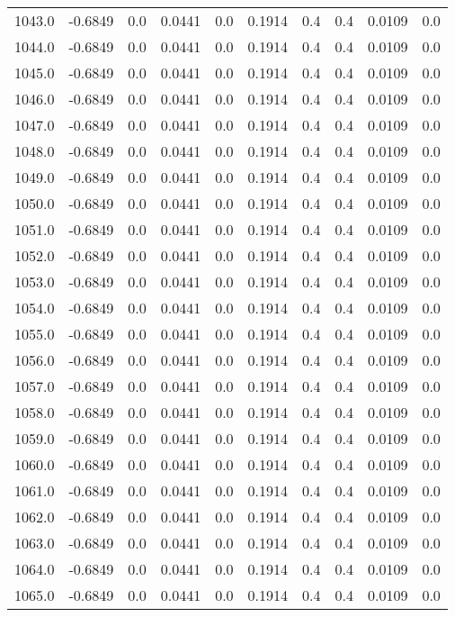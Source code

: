 \begin{longtable}{lrrrrrrrrr}
1043.0 & -0.6849 & 0.0 & 0.0441 & 0.0 & 0.1914 & 0.4 & 0.4 & 0.0109 & 0.0 \\
1044.0 & -0.6849 & 0.0 & 0.0441 & 0.0 & 0.1914 & 0.4 & 0.4 & 0.0109 & 0.0 \\
1045.0 & -0.6849 & 0.0 & 0.0441 & 0.0 & 0.1914 & 0.4 & 0.4 & 0.0109 & 0.0 \\
1046.0 & -0.6849 & 0.0 & 0.0441 & 0.0 & 0.1914 & 0.4 & 0.4 & 0.0109 & 0.0 \\
1047.0 & -0.6849 & 0.0 & 0.0441 & 0.0 & 0.1914 & 0.4 & 0.4 & 0.0109 & 0.0 \\
1048.0 & -0.6849 & 0.0 & 0.0441 & 0.0 & 0.1914 & 0.4 & 0.4 & 0.0109 & 0.0 \\
1049.0 & -0.6849 & 0.0 & 0.0441 & 0.0 & 0.1914 & 0.4 & 0.4 & 0.0109 & 0.0 \\
1050.0 & -0.6849 & 0.0 & 0.0441 & 0.0 & 0.1914 & 0.4 & 0.4 & 0.0109 & 0.0 \\
1051.0 & -0.6849 & 0.0 & 0.0441 & 0.0 & 0.1914 & 0.4 & 0.4 & 0.0109 & 0.0 \\
1052.0 & -0.6849 & 0.0 & 0.0441 & 0.0 & 0.1914 & 0.4 & 0.4 & 0.0109 & 0.0 \\
1053.0 & -0.6849 & 0.0 & 0.0441 & 0.0 & 0.1914 & 0.4 & 0.4 & 0.0109 & 0.0 \\
1054.0 & -0.6849 & 0.0 & 0.0441 & 0.0 & 0.1914 & 0.4 & 0.4 & 0.0109 & 0.0 \\
1055.0 & -0.6849 & 0.0 & 0.0441 & 0.0 & 0.1914 & 0.4 & 0.4 & 0.0109 & 0.0 \\
1056.0 & -0.6849 & 0.0 & 0.0441 & 0.0 & 0.1914 & 0.4 & 0.4 & 0.0109 & 0.0 \\
1057.0 & -0.6849 & 0.0 & 0.0441 & 0.0 & 0.1914 & 0.4 & 0.4 & 0.0109 & 0.0 \\
1058.0 & -0.6849 & 0.0 & 0.0441 & 0.0 & 0.1914 & 0.4 & 0.4 & 0.0109 & 0.0 \\
1059.0 & -0.6849 & 0.0 & 0.0441 & 0.0 & 0.1914 & 0.4 & 0.4 & 0.0109 & 0.0 \\
1060.0 & -0.6849 & 0.0 & 0.0441 & 0.0 & 0.1914 & 0.4 & 0.4 & 0.0109 & 0.0 \\
1061.0 & -0.6849 & 0.0 & 0.0441 & 0.0 & 0.1914 & 0.4 & 0.4 & 0.0109 & 0.0 \\
1062.0 & -0.6849 & 0.0 & 0.0441 & 0.0 & 0.1914 & 0.4 & 0.4 & 0.0109 & 0.0 \\
1063.0 & -0.6849 & 0.0 & 0.0441 & 0.0 & 0.1914 & 0.4 & 0.4 & 0.0109 & 0.0 \\
1064.0 & -0.6849 & 0.0 & 0.0441 & 0.0 & 0.1914 & 0.4 & 0.4 & 0.0109 & 0.0 \\
1065.0 & -0.6849 & 0.0 & 0.0441 & 0.0 & 0.1914 & 0.4 & 0.4 & 0.0109 & 0.0 \\

\end{longtable}
